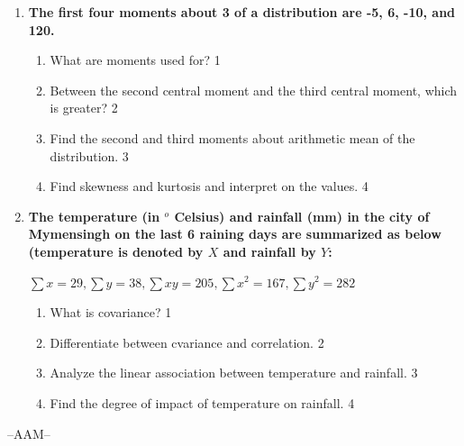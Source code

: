 \documentclass[12pt]{article}
\begin{document}
\begin{enumerate}
 \item
	  \textbf{The first four moments about 3 of a distribution are -5, 6, -10, and 120.} 
  
  \begin{enumerate}
    \item
	What are moments used for? \hfill 1
    \item
	Between the second central moment and the third central moment, which is greater? \hfill 2
    \item  
	Find the second and third moments about arithmetic mean of the distribution. \hfill 3
    \item
	Find skewness and kurtosis and interpret on the values.  \hfill 4
\end{enumerate}

  \item
	  \textbf{The temperature (in $^o$ Celsius) and rainfall (mm) in the city of Mymensingh on the last 6 raining days are summarized as below (temperature is denoted by $X$ and rainfall by $Y$: } 
	  
	  \begin{center}
	  $\sum x = 29, \sum y = 38, \sum xy = 205, \sum x^2 = 167, \sum y^2 = 282$
  \end{center}
  \begin{enumerate}
    \item
	What is covariance? \hfill 1
    \item
	Differentiate between cvariance and correlation. \hfill 2
    \item  
	Analyze the linear association between temperature and rainfall. \hfill 3
    \item
	Find the degree of impact of temperature on rainfall. \hfill 4
  \end{enumerate}

\end{enumerate}

 \vspace{2.5cm}

\begin{center}

  \vfill
  --AAM--
\end{center}
\end{document}
